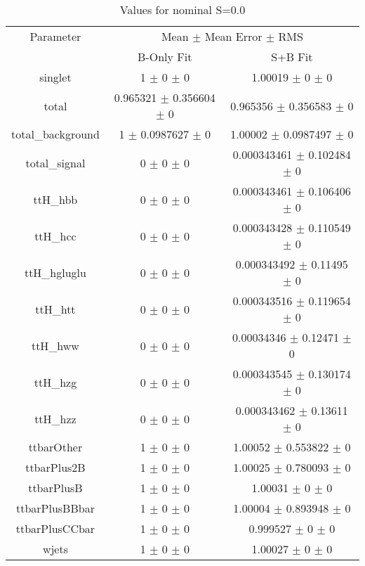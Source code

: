 \begin{table}
\centering
\caption{Values for nominal S=0.0}
\begin{tabular}{ccc}
\toprule
Parameter & \multicolumn{2}{c}{Mean $\pm$ Mean Error $\pm$ RMS}\\
 & B-Only Fit & S+B Fit\\
\midrule
singlet & \num{1} $\pm$ \num{0} $\pm$ \num{0} & \num{1.00019} $\pm$ \num{0} $\pm$ \num{0}\\
total & \num{0.965321} $\pm$ \num{0.356604} $\pm$ \num{0} & \num{0.965356} $\pm$ \num{0.356583} $\pm$ \num{0}\\
total\_background & \num{1} $\pm$ \num{0.0987627} $\pm$ \num{0} & \num{1.00002} $\pm$ \num{0.0987497} $\pm$ \num{0}\\
total\_signal & \num{0} $\pm$ \num{0} $\pm$ \num{0} & \num{0.000343461} $\pm$ \num{0.102484} $\pm$ \num{0}\\
ttH\_hbb & \num{0} $\pm$ \num{0} $\pm$ \num{0} & \num{0.000343461} $\pm$ \num{0.106406} $\pm$ \num{0}\\
ttH\_hcc & \num{0} $\pm$ \num{0} $\pm$ \num{0} & \num{0.000343428} $\pm$ \num{0.110549} $\pm$ \num{0}\\
ttH\_hgluglu & \num{0} $\pm$ \num{0} $\pm$ \num{0} & \num{0.000343492} $\pm$ \num{0.11495} $\pm$ \num{0}\\
ttH\_htt & \num{0} $\pm$ \num{0} $\pm$ \num{0} & \num{0.000343516} $\pm$ \num{0.119654} $\pm$ \num{0}\\
ttH\_hww & \num{0} $\pm$ \num{0} $\pm$ \num{0} & \num{0.00034346} $\pm$ \num{0.12471} $\pm$ \num{0}\\
ttH\_hzg & \num{0} $\pm$ \num{0} $\pm$ \num{0} & \num{0.000343545} $\pm$ \num{0.130174} $\pm$ \num{0}\\
ttH\_hzz & \num{0} $\pm$ \num{0} $\pm$ \num{0} & \num{0.000343462} $\pm$ \num{0.13611} $\pm$ \num{0}\\
ttbarOther & \num{1} $\pm$ \num{0} $\pm$ \num{0} & \num{1.00052} $\pm$ \num{0.553822} $\pm$ \num{0}\\
ttbarPlus2B & \num{1} $\pm$ \num{0} $\pm$ \num{0} & \num{1.00025} $\pm$ \num{0.780093} $\pm$ \num{0}\\
ttbarPlusB & \num{1} $\pm$ \num{0} $\pm$ \num{0} & \num{1.00031} $\pm$ \num{0} $\pm$ \num{0}\\
ttbarPlusBBbar & \num{1} $\pm$ \num{0} $\pm$ \num{0} & \num{1.00004} $\pm$ \num{0.893948} $\pm$ \num{0}\\
ttbarPlusCCbar & \num{1} $\pm$ \num{0} $\pm$ \num{0} & \num{0.999527} $\pm$ \num{0} $\pm$ \num{0}\\
wjets & \num{1} $\pm$ \num{0} $\pm$ \num{0} & \num{1.00027} $\pm$ \num{0} $\pm$ \num{0}\\
\bottomrule
\end{tabular}
\end{table}